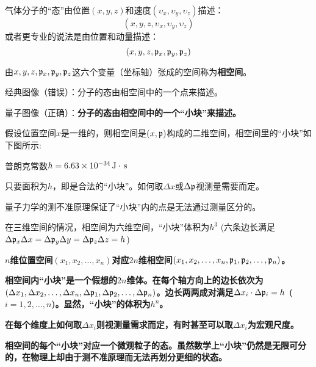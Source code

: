 \documentclass[CJK]{beamer}
\begin{document}
\begin{frame}
\bch
气体分子的“态”由位置$(x, y, z)$和速度$(\upsilon_x, \upsilon_y, \upsilon_z)$描述：
$$(x, y, z, \upsilon_x, \upsilon_y, \upsilon_z)$$
或者更专业的说法是由位置和动量描述：
$$(x, y, z, {\mathfrak{p}}_x, {\mathfrak{p}}_y, {\mathfrak{p}}_z)$$

由$x, y, z, {\mathfrak{p}}_x, {\mathfrak{p}}_y, {\mathfrak{p}}_z$这六个变量（坐标轴）张成的空间称为{\blue \bf 相空间}。

\bitem
\item{经典图像（错误）：分子的态由相空间中的一个点来描述。}
\item{量子图像（正确）：{\bf \blue 分子的态由相空间中的一个“小块”来描述。}}
\eitem

\ech
\end{frame}


\begin{frame}
\bch
假设位置空间$x$是一维的，则相空间是$(x, {\mathfrak{p}})$构成的二维空间，相空间里的“小块”如下图所示:
\emini
{}
\bitem
\item{普朗克常数$h=6.63\times 10^{-34}\,\mathrm{J}\cdot\,\mathrm{s}$}
\item{只要面积为$h$，即是合法的“小块”。如何取$\Delta x$或$\Delta {\mathfrak{p}}$视测量需要而定。}
\item{量子力学的测不准原理保证了“小块”内的点是无法通过测量区分的。}
\eitem
\emini

\skipline

在三维空间的情况，相空间为六维空间，“小块”体积为$h^3$ (六条边长满足$\Delta {\mathfrak{p}}_x\Delta x =\Delta {\mathfrak{p}}_y\Delta y =\Delta {\mathfrak{p}}_z\Delta z = h$)
\ech
\end{frame}


\begin{frame}
\bch
\bitem
\item{\bf $n$维位置空间$(x_1, x_2, \ldots, x_n)$对应$2n$维相空间$(x_1, x_2, \ldots, x_n, {\mathfrak{p}}_1, {\mathfrak{p}}_2, \ldots, {\mathfrak{p}}_n)$。}
\item{\bf 相空间内“小块”是一个假想的$2n$维体。在每个轴方向上的边长依次为$(\Delta x_1, \Delta x_2, \ldots, \Delta x_n, \Delta {\mathfrak{p}}_1, \Delta {\mathfrak{p}}_2, \ldots, \Delta {\mathfrak{p}}_n)$。边长两两成对满足$\Delta x_i \cdot \Delta {\mathfrak{p}}_i = h$ ($i=1, 2, \ldots, n$)。显然，“小块”的体积为$h^n$。}
\item{\bf 在每个维度上如何取$\Delta x_i$则视测量需求而定，有时甚至可以取$\Delta x_i$为宏观尺度。}
\item{\bf 相空间的每个“小块”对应一个微观粒子的态。虽然数学上“小块”仍然是无限可分的，在物理上却由于测不准原理而无法再划分更细的状态。}
\eitem
\ech
\end{frame}
\end{document}
